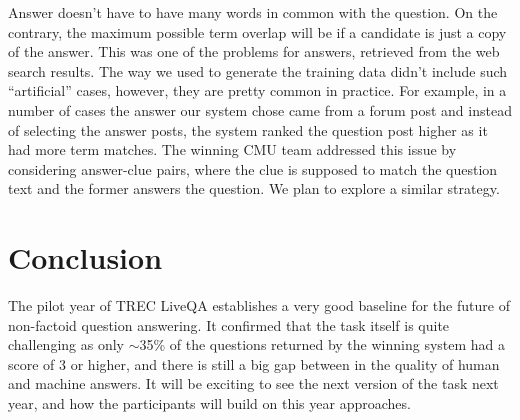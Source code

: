 \documentclass[]{article}
\begin{document}
Answer doesn't have to have many words in common with the question.
On the contrary, the maximum possible term overlap will be if a candidate is just a copy of the answer.
This was one of the problems for answers, retrieved from the web search results.
The way we used to generate the training data didn't include such ``artificial'' cases, however, they are pretty common in practice.
For example, in a number of cases the answer our system chose came from a forum post and instead of selecting the answer posts, the system ranked the question post higher as it had more term matches.
The winning CMU team addressed this issue by considering answer-clue pairs, where the clue is supposed to match the question text and the former answers the question.
We plan to explore a similar strategy.

\section{Conclusion}

The pilot year of TREC LiveQA establishes a very good baseline for the future of non-factoid question answering.
It confirmed that the task itself is quite challenging as only $\sim$35\% of the questions returned by the winning system had a score of 3 or higher, and there is still a big gap between in the quality of human and machine answers.
It will be exciting to see the next version of the task next year, and how the participants will build on this year approaches.




\end{document}
